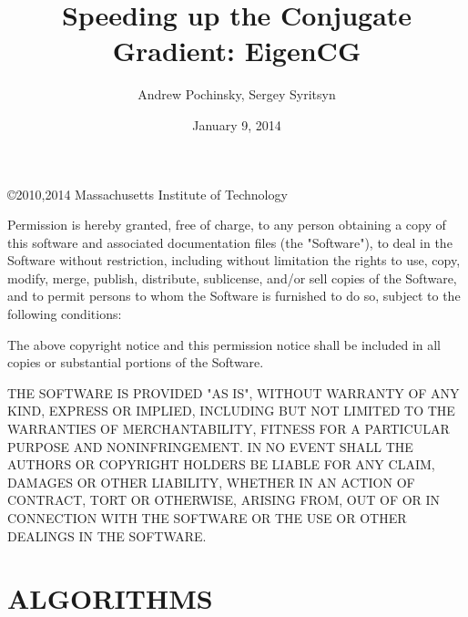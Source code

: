 \documentclass[oneside,openright]{report}
\title{Speeding up the Conjugate Gradient: EigenCG}
\author{Andrew Pochinsky, Sergey Syritsyn}
\date{January 9, 2014}
\begin{document}
\maketitle
\thispagestyle{empty}\hbox{}
\vfill
\copyright 2010,2014 Massachusetts Institute of Technology

Permission is hereby granted, free of charge, to any person obtaining
a copy of this software and associated documentation files (the
"Software"), to deal in the Software without restriction, including
without limitation the rights to use, copy, modify, merge, publish,
distribute, sublicense, and/or sell copies of the Software, and to
permit persons to whom the Software is furnished to do so, subject to
the following conditions:

The above copyright notice and this permission notice shall be
included in all copies or substantial portions of the Software.

THE SOFTWARE IS PROVIDED "AS IS", WITHOUT WARRANTY OF ANY KIND,
EXPRESS OR IMPLIED, INCLUDING BUT NOT LIMITED TO THE WARRANTIES OF
MERCHANTABILITY, FITNESS FOR A PARTICULAR PURPOSE AND
NONINFRINGEMENT. IN NO EVENT SHALL THE AUTHORS OR COPYRIGHT HOLDERS BE
LIABLE FOR ANY CLAIM, DAMAGES OR OTHER LIABILITY, WHETHER IN AN ACTION
OF CONTRACT, TORT OR OTHERWISE, ARISING FROM, OUT OF OR IN CONNECTION
WITH THE SOFTWARE OR THE USE OR OTHER DEALINGS IN THE SOFTWARE.
\pagebreak

\tableofcontents

\listofalgorithms

\chapter{ALGORITHMS}
\end{document}
